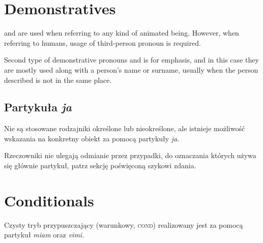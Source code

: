 \section{Demonstratives}
\label{sec:demonstratives}

 and  are used when referring to any kind of animated
being. However, when referring to humans, usage of third-person pronoun is
required.



Second type of demonstrative pronouns  and  is for
emphasis, and in this case they are mostly used along with a person's name or
surname, usually when the person described is not in the same place.



\subsection{Partykuła \emph{ja}}

Nie są stosowane rodzajniki określone lub nieokreślone, ale istnieje możliwość
wskazania na konkretny obiekt za pomocą partykuły \emph{ja}.


Rzeczowniki nie ulegają odmianie przez przypadki, do oznaczania których używa
się głównie partykuł, patrz sekcję poświęconą szykowi zdania.

\section{Conditionals}
\label{sec:conditionals}

Czysty tryb przypuszczający (warunkowy, \textsc{cond}) realizowany jest za
pomocą partykuł \emph{miam} oraz \emph{vimi}.


